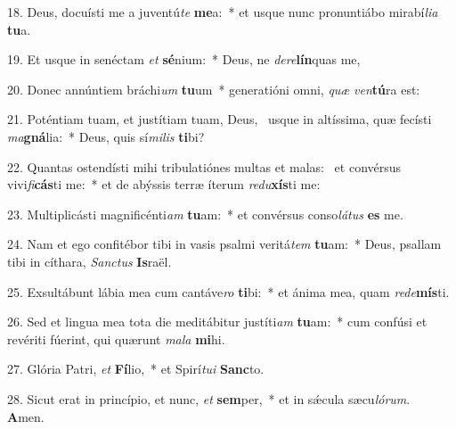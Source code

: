18. Deus, docuísti me a juventú\textit{te} \textbf{me}a:~*  et usque nunc pronuntiábo mirabí\textit{li}\textit{a} \textbf{tu}a.\

19. Et usque in senéctam \textit{et} \textbf{sé}nium:~*  Deus, ne \textit{de}\textit{re}\textbf{lín}quas me,\

20. Donec annúntiem bráchi\textit{um} \textbf{tu}um~*  generatióni omni, \textit{quæ} \textit{ven}\textbf{tú}ra est:\

21. Poténtiam tuam, et justítiam tuam, Deus, \dag\  usque in altíssima, quæ fecísti \textit{ma}\textbf{gná}lia:~*  Deus, quis sí\textit{mi}\textit{lis} \textbf{ti}bi?\

22. Quantas ostendísti mihi tribulatiónes multas et malas: \dag\  et convérsus vivi\textit{fi}\textbf{cás}ti me:~*  et de abýssis terræ íterum \textit{re}\textit{du}\textbf{xís}ti me:\

23. Multiplicásti magnificénti\textit{am} \textbf{tu}am:~*  et convérsus conso\textit{lá}\textit{tus} \textbf{es} me.\

24. Nam et ego confitébor tibi in vasis psalmi veritá\textit{tem} \textbf{tu}am:~*  Deus, psallam tibi in cíthara, \textit{Sanc}\textit{tus} \textbf{Is}raël.\

25. Exsultábunt lábia mea cum cantáve\textit{ro} \textbf{ti}bi:~*  et ánima mea, quam \textit{red}\textit{e}\textbf{mís}ti.\

26. Sed et lingua mea tota die meditábitur justíti\textit{am} \textbf{tu}am:~*  cum confúsi et revériti fúerint, qui quærunt \textit{ma}\textit{la} \textbf{mi}hi.\

27. Glória Patri, \textit{et} \textbf{Fí}lio,~*  et Spirí\textit{tu}\textit{i} \textbf{Sanc}to.\

28. Sicut erat in princípio, et nunc, \textit{et} \textbf{sem}per,~*  et in sǽcula sæcu\textit{ló}\textit{rum}. \textbf{A}men.\

